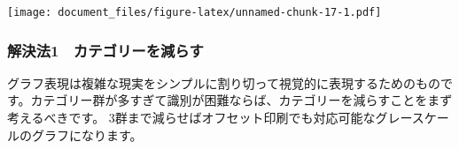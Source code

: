 \documentclass[]{article}
\newenvironment{Shaded}{\begin{snugshade}}{\end{snugshade}}
\newcommand{\DataTypeTok}[1]{\textcolor[rgb]{0.13,0.29,0.53}{#1}}
\newcommand{\KeywordTok}[1]{\textcolor[rgb]{0.13,0.29,0.53}{\textbf{#1}}}
\newcommand{\NormalTok}[1]{#1}
\newcommand{\OperatorTok}[1]{\textcolor[rgb]{0.81,0.36,0.00}{\textbf{#1}}}
\newcommand{\StringTok}[1]{\textcolor[rgb]{0.31,0.60,0.02}{#1}}
\begin{document}
\begin{Shaded}
\end{Shaded}

\texttt{[image: document\_files/figure-latex/unnamed-chunk-17-1.pdf]}

\hypertarget{1}{%
\subsubsection{解決法1　カテゴリーを減らす}\label{1}}

グラフ表現は複雑な現実をシンプルに割り切って視覚的に表現するためのものです。カテゴリー群が多すぎて識別が困難ならば、カテゴリーを減らすことをまず考えるべきです。
3群まで減らせばオフセット印刷でも対応可能なグレースケールのグラフになります。
\end{document}
